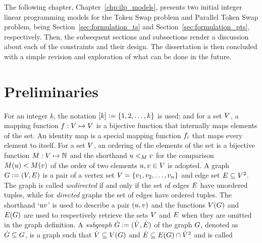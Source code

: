 \documentclass[msc]{ppgccufmg}    %
\begin{document}
The following chapter, Chapter~\ref{chp:ilp_models}, presents two initial integer 
linear programming models for the Token Swap problem and Parallel Token
Swap problem, being Section~\ref{sec:formulation_ts} and Section~\ref{sec:formulation_pts},
respectively.
Then, the subsequent sections and subsections render a discussion about each of 
the constraints and their design.
The dissertation is then concluded with a simple revision and exploration of 
what can be done in the future.

\section{Preliminaries}
\label{sec:intro:prelim}

For an integer $k$, the notation $[k] \vcentcolon= \{1, 2, 
\ldots, k\}$ is used; and for a set $V$, a mapping function $f : V \mapsto V$ is a bijective function that internally maps
elements of the set.
An identity map is a special mapping function $f_{i}$ that maps every element
to itself. 
For a set $V$, an ordering of the elements of the set is a bijective 
function $M : V \mapsto \mathbb{N}$ and the 
shorthand $u <_{M} v$ for the comparison $
M(u) < M(v)$ of the order of 
two elements $u,v\in V$ is adopted.
A graph $G \vcentcolon= (V, E)$ is a pair of a vertex set 
$V = \{v_1, v_2, \ldots, 
v_{n}\}$ and edge set 
$E \subseteq {V^2}$.
The graph is called \textit{undirected} if and only if the set of edges 
$E$ have unordered tuples, while for \textit{directed} graphs the
set of edges have ordered tuples.
The shorthand `$uv$' is used to describe a pair $(u,
v)$ and the functions $V(G)$ and $E(G)$ are used to 
respectively retrieve the sets $V$ and $E$ when they are
omitted in the graph definition.
A \textit{subgraph} $\dot{G} \vcentcolon= (\dot{V}, 
\dot{E})$ of the graph $G$, denoted as $\dot{G} \subseteq 
G$, is a graph such that $\dot{V} \subseteq V(G)$ and
$\dot{E} \subseteq E(G) \cap \dot{V}^{2}$ and is called 
\end{document}
